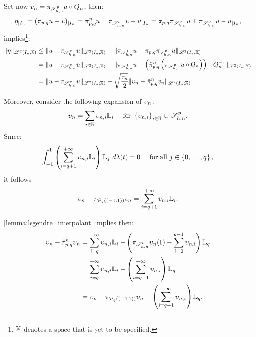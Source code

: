 Set now $\upsilon_n = \pi_{\mathscr{S}^p_{h, n}} u \circ Q_n$, then:
\begin{gather}
    \eta_{\mid I_n} = (\pi_{p, q} u - u)_{\mid I_n} = \pi_{p, q}^n u \pm \pi_{\mathscr{S}^p_{h, n}} u - u_{\mid I_n} = \pi_{p, q} \pi_{\mathscr{S}^p_{h, n}} u \pm \pi_{\mathscr{S}^p_{h, n}} u - u_{\mid I_n},
\end{gather}
implies\footnote{$\mathbb{X}$ denotes a space that is yet to be specified.}:
\begin{align}
    \lVert \eta \rVert_{\mathscr{L}^{2}(I_n; \mathbb{X})} & \leq \lVert u - \pi_{\mathscr{S}^p_{h, n}} u \rVert_{\mathscr{L}^{2}(I_n; \mathbb{X})} + \lVert \pi_{\mathscr{S}^p_{h, n}} u - \pi_{p, q} \pi_{\mathscr{S}^p_{h, n}} u \rVert_{\mathscr{L}^{2}(I_n; \mathbb{X})} \notag \\
    &= \lVert u - \pi_{\mathscr{S}^p_{h, n}} u \rVert_{\mathscr{L}^{2}(I_n; \mathbb{X})} + \lVert \pi_{\mathscr{S}^p_{h, n}} u - \left( \hat{\pi}_{p, q}^n \left( \pi_{\mathscr{S}^p_{h, n}} u \circ Q_n \right) \right) \circ Q_n^{-1} \rVert_{\mathscr{L}^{2}(I_n; \mathbb{X})} \notag \\
    &= \lVert u - \pi_{\mathscr{S}^p_{h, n}} u \rVert_{\mathscr{L}^{2}(I_n; \mathbb{X})} + \sqrt{\frac{\tau_n}{2}} \lVert \upsilon_n - \hat{\pi}_{p, q}^n \upsilon_n \rVert_{\mathscr{L}^{2}(I_n; \mathbb{X})}.
\end{align}

Moreover, consider the following expansion of $\upsilon_n$:
\begin{gather}
    \upsilon_n = \sum_{i \in \mathbb{N}} \upsilon_{n, i} \mathbb{L}_i \quad \text{ for } \left\{ \upsilon_{n, i} \right\}_{i \in \mathbb{N}} \subset \mathscr{S}^p_{h, n}.
\end{gather}
Since:
\begin{gather}
    \int_{-1}^1 \left( \sum_{i = q + 1}^{+\infty} \upsilon_{n, i} \mathbb{L}_i \right) \mathbb{L}_j ~ d \lambda(t) = 0 \quad \text{ for all } j \in \left\{ 0, \dots, q \right\},
\end{gather}
it follows:
\begin{gather}
    \upsilon_n - \pi_{\mathcal{P}_{q}((-1, 1))} \upsilon_n = \sum_{i = q + 1}^{+\infty} \upsilon_{n, i} \mathbb{L}_i.
\end{gather}

\cref{lemma:legendre_interpolant} implies then:
\begin{align}
    \upsilon_n - \hat{\pi}_{p, q}^n \upsilon_n &= \sum_{i = q}^{+\infty} \upsilon_{n, i} \mathbb{L}_i - \left( \pi_{\mathscr{S}^p_{h, n}} \upsilon_n(1) - \sum_{i = 0}^{q - 1} \upsilon_{n, i} \right) \mathbb{L}_q \notag \\
    &= \sum_{i = q}^{+\infty} \upsilon_{n, i} \mathbb{L}_i - \left( \sum_{i = q + 1}^{+\infty} \upsilon_{n, i} \right) \mathbb{L}_q \notag \\
    &= \upsilon_n - \pi_{\mathcal{P}_{q}((-1, 1))} \upsilon_n - \left( \sum_{i = q + 1}^{+\infty} \upsilon_{n, i} \right) \mathbb{L}_q.
\end{align}


